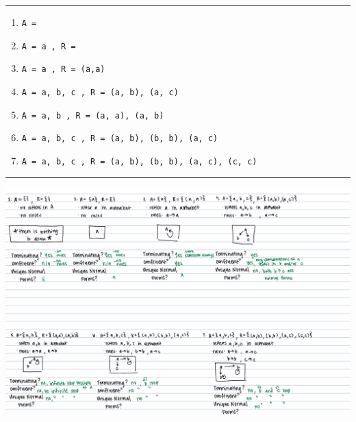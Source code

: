 \documentclass{article}
\theoremstyle{theorem}
\theoremstyle{definition}
\theoremstyle{remark}
\begin{document}
\noindent
  {\color{gray} \rule{\linewidth}{0.05mm}}
\begin{enumerate}
  \item[\ding{99}] \texttt{A = {}}
  \item[\ding{99}] \texttt{A = {a} , R = {}}
  \item[\ding{99}] \texttt{A = {a} , R = {(a,a)}}
  \item[\ding{99}] \texttt{A = {a, b, c} , R = {(a, b), (a, c)}}
  \item[\ding{99}] \texttt{A = {a, b} , R = {(a, a), (a, b)}}
  \item[\ding{99}] \texttt{A = {a, b, c} , R = {(a, b), (b, b), (a, c)}}
  \item[\ding{99}] \texttt{A = {a, b, c} , R = {(a, b), (b, b), (a, c), (c, c)}}
\end{enumerate}
\noindent
  {\color{gray} \rule{\linewidth}{0.05mm}}

\includegraphics[width=20cm]{arsDrawn.png}
\end{document}
